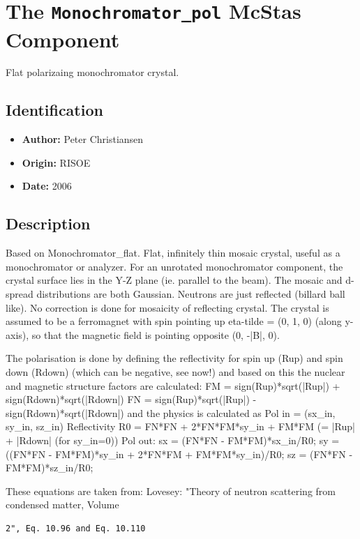 \section{The \texttt{Monochromator\_pol} McStas Component}
Flat polarizaing monochromator crystal.

\subsection*{Identification}
\begin{itemize}
  \item \textbf{Author:} Peter Christiansen
  \item \textbf{Origin:} RISOE
  \item \textbf{Date:} 2006
\end{itemize}

\subsection*{Description}
Based on Monochromator\_flat. Flat, infinitely thin mosaic crystal, useful as a monochromator or analyzer. For an unrotated monochromator component, the crystal surface lies in the Y-Z plane (ie. parallel to the beam). The mosaic and d-spread distributions are both Gaussian. Neutrons are just reflected (billard ball like). No correction is done for mosaicity of reflecting crystal. The crystal is assumed to be a ferromagnet with spin pointing up eta-tilde = (0, 1, 0) (along y-axis), so that the magnetic field is pointing opposite (0, -|B|, 0).

The polarisation is done by defining the reflectivity for spin up (Rup) and spin down (Rdown) (which can be negative, see now!) and based on this the nuclear and magnetic structure factors are calculated: FM = sign(Rup)*sqrt(|Rup|) + sign(Rdown)*sqrt(|Rdown|) FN = sign(Rup)*sqrt(|Rup|) - sign(Rdown)*sqrt(|Rdown|) and the physics is calculated as Pol in = (sx\_in, sy\_in, sz\_in) Reflectivity R0 = FN*FN + 2*FN*FM*sy\_in + FM*FM (= |Rup| + |Rdown| (for sy\_in=0)) Pol out: sx = (FN*FN - FM*FM)*sx\_in/R0; sy = ((FN*FN - FM*FM)*sy\_in + 2*FN*FM + FM*FM*sy\_in)/R0; sz = (FN*FN - FM*FM)*sz\_in/R0;

These equations are taken from: Lovesey: "Theory of neutron scattering from condensed matter, Volume

\begin{verbatim}
2", Eq. 10.96 and Eq. 10.110
\end{verbatim}

